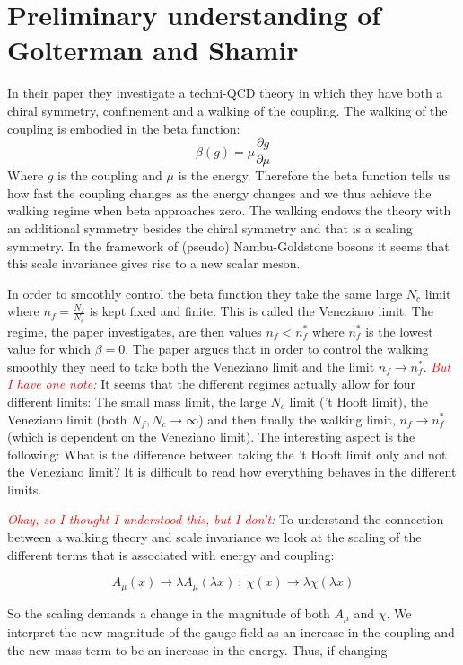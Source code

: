 \documentclass[a4,10pt,titlepage]{article}
\renewcommand\[{\begin{equation*}}
\renewcommand\]{\end{equation*}}
\newcommand{\be}{\begin{equation}}
\newcommand{\ee}{\end{equation}}
\numberwithin{equation}{section}
\newcommand{\edit}[1]{\textcolor{red}{\textit{#1}}}
\begin{document}
\section{Preliminary understanding of Golterman and Shamir}

In their paper they investigate a techni-QCD theory in which they have both a chiral symmetry, confinement and a walking of the coupling. The walking of the coupling is embodied in the beta function:
\be
\beta(g)=\mu\frac{\partial g}{\partial \mu}
\ee
Where $g$ is the coupling and $\mu$ is the energy. Therefore the beta function tells us how fast the coupling changes as the energy changes and we thus achieve the walking regime when beta approaches zero. The walking endows the theory with an additional symmetry besides the chiral symmetry and that is a scaling symmetry. In the framework of (pseudo) Nambu-Goldstone bosons it seems that this scale invariance gives rise to a new scalar meson. 

In order to smoothly control the beta function they take the same large $N_c$ limit where $n_f=\frac{N_f}{N_c}$ is kept fixed and finite. This is called the Veneziano limit. The regime, the paper investigates, are then values $n_f<n_f^*$ where $n_f^*$ is the lowest value for which $\beta=0$. The paper argues that in order to control the walking smoothly they need to take both the Veneziano limit and the limit $n_f\longrightarrow n_f^*$. \edit{But I have one note:} It seems that the different regimes actually allow for four different limits: The small mass limit, the large $N_c$ limit ('t Hooft limit), the Veneziano limit (both $N_f, N_c \longrightarrow \infty$) and then finally the walking limit, $n_f \longrightarrow n_f^*$ (which is dependent on the Veneziano limit). The interesting aspect is the following: What is the difference between taking the 't Hooft limit only and not the Veneziano limit? It is difficult to read how everything behaves in the different limits.

\edit{Okay, so I thought I understood this, but I don't:} To understand the connection between a walking theory and scale invariance we look at the scaling of the different terms that is associated with energy and coupling:

\be
A_\mu(x)\longrightarrow \lambda A_\mu(\lambda x) \ ; \ \chi(x)\longrightarrow\lambda \chi(\lambda x)
\ee

So the scaling demands a change in the magnitude of both $A_\mu$ and $\chi$. We interpret the new magnitude of the gauge field as an increase in the coupling and the new mass term to be an increase in the energy. Thus, if changing 
\end{document}
